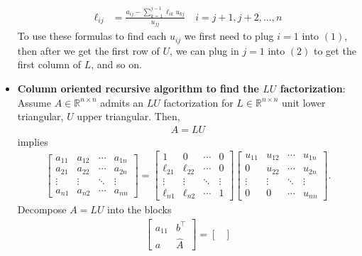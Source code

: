 \documentclass{report}
\begin{document}
\begin{itemize}
\begin{align*}
            \ell_{ij} &= \frac{a_{ij} - \sum_{k=1}^{j-1}\ell_{ik}u_{kj}}{u_{jj}} \quad i=j+1,j+2,...,n \tag{2}
        \end{align*}
        \bigbreak \noindent 
        To use these formulas to find each $u_{ij}$ we first need to plug $i=1$ into $(1)$, then after we get the first row of $U$, we can plug in $j=1$ into $(2)$ to get the first column of $L$, and so on.
        \item \textbf{Column oriented recursive algorithm to find the $LU$ factorization}: Assume $A \in \mathbb{R}^{n\times n }$ admits an $LU$ factorization for $L\in \mathbb{R}^{n\times n}$ unit lower triangular, $U$ upper triangular. Then,
            \begin{align*}
                A = LU
            \end{align*}
            implies
            \begin{align*}
                \begin{bmatrix} a_{11} & a_{12} & \cdots & a_{1n} \\ a_{21} & a_{22} & \cdots & a_{2n} \\ \vdots & \vdots & \ddots & \vdots \\ a_{n1} & a_{n2} & \cdots & a_{nn} \end{bmatrix} = 
                \begin{bmatrix} 1 & 0 & \cdots & 0 \\ \ell_{21} & \ell_{22} & \cdots & 0 \\ \vdots & \vdots & \ddots & \vdots \\ \ell_{n1} & \ell_{n2} & \cdots & 1 \end{bmatrix}
                \begin{bmatrix} u_{11} & u_{12} & \cdots & u_{1n} \\ 0 & u_{22} & \cdots & u_{2n} \\ \vdots & \vdots & \ddots & \vdots \\ 0 & 0 & \cdots & u_{nn} \end{bmatrix}
            .\end{align*}
            Decompose $A = LU$ into the blocks
            \begin{align*}
                \begin{bmatrix}
                    a_{11} & b^{\top} \\
                    a & \hat{A}
                \end{bmatrix}
                =
                \begin{bmatrix}

\end{bmatrix}
\end{align*}
\end{itemize}
\end{document}
